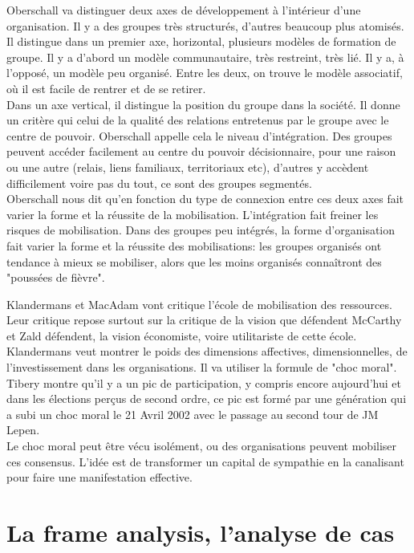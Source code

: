 \documentclass[10pt, a4paper, openany]{book}
\begin{document}
Oberschall va distinguer deux axes de développement à l'intérieur d'une organisation. Il y a des groupes très structurés, d'autres beaucoup plus atomisés. \\
Il distingue dans un premier axe, horizontal, plusieurs modèles de formation de groupe. Il y a d'abord un modèle communautaire, très restreint, très lié. Il y a, à l'opposé, un modèle peu organisé. Entre les deux, on trouve le modèle associatif, où il est facile de rentrer et de se retirer. \\
Dans un axe vertical, il distingue la position du groupe dans la société. Il donne un critère qui celui de la qualité des relations entretenus par le groupe avec le centre de pouvoir. Oberschall appelle cela le niveau d'intégration. Des groupes peuvent accéder facilement au centre du pouvoir décisionnaire, pour une raison ou une autre (relais, liens familiaux, territoriaux etc), d'autres y accèdent difficilement voire pas du tout, ce sont des groupes segmentés. \\
Oberschall nous dit qu'en fonction du type de connexion entre ces deux axes fait varier la forme et la réussite de la mobilisation. L'intégration fait freiner les risques de mobilisation. Dans des groupes peu intégrés, la forme d'organisation fait varier la forme et la réussite des mobilisations: les groupes organisés ont tendance à mieux se mobiliser, alors que les moins organisés connaîtront des "poussées de fièvre". 


Klandermans et MacAdam vont critique l'école de mobilisation des ressources. Leur critique repose surtout sur la critique de la vision que défendent McCarthy et Zald défendent, la vision économiste, voire utilitariste de cette école. \\
Klandermans veut montrer le poids des dimensions affectives, dimensionnelles, de l'investissement dans les organisations. Il va utiliser la formule de "choc moral". Tibery montre qu'il y a un pic de participation, y compris encore aujourd'hui et dans les élections perçus de second ordre, ce pic est formé par une génération qui a subi un choc moral le 21 Avril 2002 avec le passage au second tour de JM Lepen. \\
Le choc moral peut être vécu isolément, ou des organisations peuvent mobiliser ces consensus. L'idée est de transformer un capital de sympathie en la canalisant pour faire une manifestation effective. 

\chapter{La frame analysis, l'analyse de cas}
\end{document}
